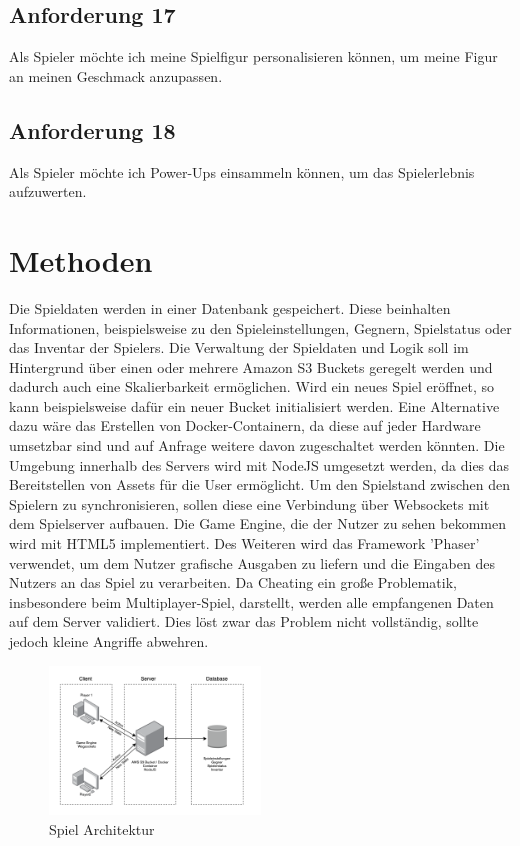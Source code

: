 \documentclass[conference]{IEEEtran}
\begin{document}
\subsection{Anforderung 17}
Als Spieler möchte ich meine Spielfigur personalisieren können, um meine Figur an meinen Geschmack anzupassen.

\subsection{Anforderung 18}
Als Spieler möchte ich Power-Ups einsammeln können, um das Spielerlebnis aufzuwerten.

\section{Methoden}
Die Spieldaten werden in einer Datenbank gespeichert.
Diese beinhalten Informationen, beispielsweise zu den Spieleinstellungen, Gegnern, Spielstatus oder das Inventar der Spielers. 
Die Verwaltung der Spieldaten und Logik soll im Hintergrund über einen oder mehrere Amazon S3 Buckets geregelt werden und dadurch auch eine Skalierbarkeit ermöglichen. Wird ein neues Spiel eröffnet, so kann beispielsweise dafür ein neuer Bucket initialisiert werden. 
Eine Alternative dazu wäre das Erstellen von Docker-Containern, da diese auf jeder Hardware umsetzbar sind und auf Anfrage weitere davon zugeschaltet werden könnten. Die Umgebung innerhalb des Servers wird mit NodeJS umgesetzt werden, da dies das Bereitstellen von Assets für die User ermöglicht. Um den Spielstand zwischen den Spielern zu synchronisieren, sollen diese eine Verbindung über Websockets mit dem Spielserver aufbauen.
Die Game Engine, 
die der Nutzer zu sehen bekommen wird mit HTML5 implementiert. Des Weiteren wird das Framework 'Phaser' verwendet, um dem Nutzer grafische Ausgaben zu liefern und die Eingaben des Nutzers an das Spiel zu verarbeiten.
Da Cheating ein große Problematik, insbesondere beim Multiplayer-Spiel, darstellt, werden alle empfangenen Daten auf dem Server validiert. Dies löst zwar das Problem nicht vollständig, sollte jedoch kleine Angriffe abwehren. 
\begin{figure}[H]
    \centering
    \includegraphics[width=0.5\textwidth]{res/game_arch.png}
    \caption{Spiel Architektur}
\end{figure}
\end{document}

